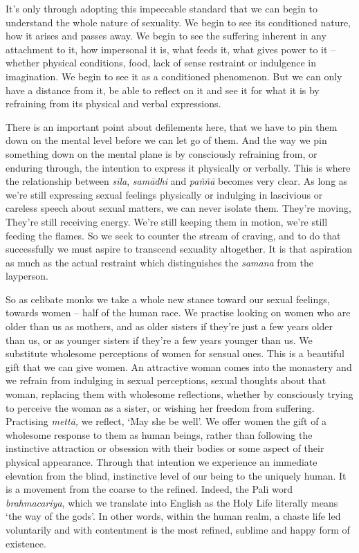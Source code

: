 It's only through adopting this impeccable standard that we can begin to
understand the whole nature of sexuality. We begin to see its
conditioned nature, how it arises and passes away. We begin to see the
suffering inherent in any attachment to it, how impersonal it is, what
feeds it, what gives power to it -- whether physical conditions, food,
lack of sense restraint or indulgence in imagination. We begin to see it
as a conditioned phenomenon. But we can only have a distance from it, be
able to reflect on it and see it for what it is by refraining from its
physical and verbal expressions.

There is an important point about defilements here, that we have to pin
them down on the mental level before we can let go of them. And the way
we pin something down on the mental plane is by consciously refraining
from, or enduring through, the intention to express it physically or
verbally. This is where the relationship between \emph{sīla},
\emph{samādhi} and \emph{paññā} becomes very clear. As long as we're
still expressing sexual feelings physically or indulging in lascivious
or careless speech about sexual matters, we can never isolate them.
They're moving, They're still receiving energy. We're still keeping them
in motion, we're still feeding the flames. So we seek to counter the
stream of craving, and to do that successfully we must aspire to
transcend sexuality altogether. It is that aspiration as much as the
actual restraint which distinguishes the \emph{samana} from the
layperson.

So as celibate monks we take a whole new stance toward our sexual
feelings, towards women -- half of the human race. We practise looking
on women who are older than us as mothers, and as older sisters if
they're just a few years older than us, or as younger sisters if they're
a few years younger than us. We substitute wholesome perceptions of
women for sensual ones. This is a beautiful gift that we can give women.
An attractive woman comes into the monastery and we refrain from
indulging in sexual perceptions, sexual thoughts about that woman,
replacing them with wholesome reflections, whether by consciously trying
to perceive the woman as a sister, or wishing her freedom from
suffering. Practising \emph{mettā,} we reflect, `May she be well'. We
offer women the gift of a wholesome response to them as human beings,
rather than following the instinctive attraction or obsession with their
bodies or some aspect of their physical appearance. Through that
intention we experience an immediate elevation from the blind,
instinctive level of our being to the uniquely human. It is a movement
from the coarse to the refined. Indeed, the Pali word
\emph{brahmacariya}, which we translate into English as the Holy Life
literally means `the way of the gods'. In other words, within the human
realm, a chaste life led voluntarily and with contentment is the most
refined, sublime and happy form of existence.

